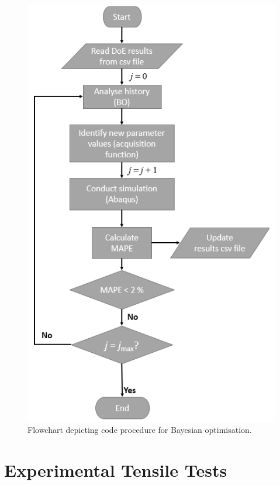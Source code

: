 \documentclass[preprint, review, 12pt]{elsarticle}
\begin{document}
	\begin{figure}[!htbp]
		\centering
		\includegraphics[width=\linewidth, height=0.8\textheight, keepaspectratio]{BO_FLOWCHART}
		\caption{Flowchart depicting code procedure for Bayesian optimisation.}
		\label{fig:bo_flowchart}
	\end{figure}

	\section{Experimental Tensile Tests}
	\label{h:tensile_tests}
\end{document}
